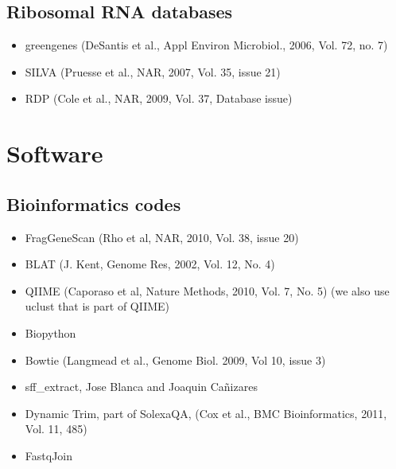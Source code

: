 \documentclass[12pt,fullpage]{report}
\begin{document}
\begin{appendices}
\subsection{Ribosomal RNA databases}
\begin{itemize}
  \item    greengenes \cite{GREENGENES} (DeSantis et al., Appl Environ Microbiol., 2006, Vol. 72, no. 7)
  \item    SILVA \cite{SILVA} (Pruesse et al., NAR, 2007, Vol. 35, issue 21)
  \item    RDP \cite{RDP} (Cole et al., NAR, 2009, Vol. 37, Database issue)
\end{itemize}
\section{Software}
\subsection{Bioinformatics codes}
\label{section:bioinformatics-codes}
\begin{itemize}
\item      FragGeneScan \cite{FGS} (Rho et al, NAR, 2010, Vol. 38, issue 20)
 \item     BLAT \cite{BLAT} (J. Kent, Genome Res, 2002, Vol. 12, No. 4)
 \item     QIIME \cite{QIIME} (Caporaso et al, Nature Methods, 2010, Vol. 7, No. 5) (we also use uclust that is part of QIIME)
 \item     Biopython
 \item     Bowtie \cite{BOWTIE} (Langmead et al., Genome Biol. 2009, Vol 10, issue 3)
 \item     sff\_extract, Jose Blanca and Joaquin Cañizares
\item      Dynamic Trim, part of SolexaQA, \cite{SOLEXAQA} (Cox et al., BMC Bioinformatics, 2011, Vol. 11, 485)
 \item     FastqJoin
\end{itemize}

\end{appendices}
\end{document}
